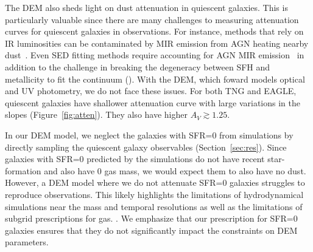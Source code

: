 The DEM also sheds light on dust attenuation in quiescent galaxies. This is
particularly valuable since there are many challenges to measuring attenuation
curves for quiescent galaxies in observations. For instance, methods that rely
on IR luminosities can be contaminated by MIR emission from AGN heating nearby
dust~\cite{kirkpatrick2015}. Even SED fitting methods require accounting for
AGN MIR emission~\citep{salim2016, leja2018, salim2018} in addition to the
challenge in breaking the degeneracy between SFH and metallicity to fit the
continuum (). With the DEM, which foward models optical and UV
photometry, we do not face these issues. For both TNG and EAGLE, quiescent
galaxies have shallower attenuation curve with large variations in the slopes
(Figure~\ref{fig:atten}). They also have higher $A_V \gtrsim 1.25$. 



In our DEM model, we neglect the galaxies with SFR=0 from simulations by
directly sampling the quiescent galaxy observables (Section~\ref{sec:res}).
Since galaxies with SFR=0 predicted by the simulations do not have recent 
star-formation and also have 0 gas mass, we would expect them to also have no dust. However, a DEM model
where we do not attenuate SFR=0 galaxies struggles to reproduce observations.
This likely highlights the limitations of hydrodynamical simulations near the
mass and temporal resolutions as well as the limitations of subgrid
prescriptions for gas. . 
We emphasize that our prescription for SFR=0 galaxies ensures that they do not
significantly impact the constraints on DEM parameters. 



